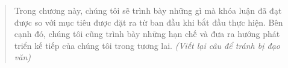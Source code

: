 \label{chux1b0ux1a1ng-5.-kux1ebft-luux1eadn-vuxe0-hux1b0ux1edbng-phuxe1t-triux1ec3n}

\begin{quote}
Trong chương này, chúng tôi sẽ trình bày những gì mà khóa luận đã đạt được so với mục tiêu được đặt ra từ ban đầu khi bắt đầu thực hiện. Bên cạnh đó, chúng tôi cũng trình bày những hạn chế và đưa ra hướng phát triển kế tiếp của chúng tôi trong tương lai. \emph{(Viết lại câu để tránh bị đạo văn)}
\end{quote}

